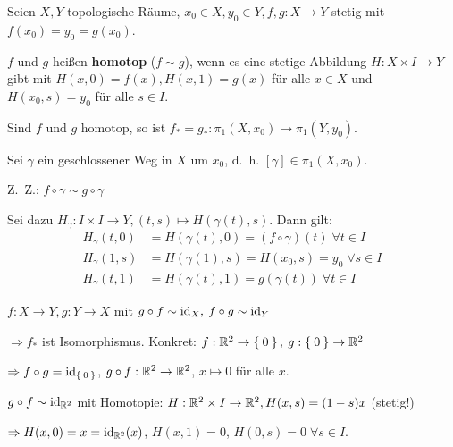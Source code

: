 \begin{definition}
    Seien $X, Y$ topologische Räume, $x_0 \in X, y_0 \in Y, f, g: X \rightarrow Y$
    stetig mit $f(x_0) = y_0 = g(x_0)$.

    $f$ und $g$ heißen \textbf{homotop} ($f \sim g$), wenn es eine stetige
    Abbildung $H: X \times I \rightarrow Y$ gibt mit $H(x,0) = f(x), H(x,1)=g(x)$
    für alle $x \in X$ und $H(x_0, s) = y_0$ für alle $s \in I$.
\end{definition}

\begin{bemerkung}
    Sind $f$ und $g$ homotop, so ist $f_* = g_*: \pi_1 (X, x_0) \rightarrow \pi_1(Y, y_0)$.
\end{bemerkung}

\begin{beweis}
    Sei $\gamma$ ein geschlossener Weg in $X$ um $x_0$, d.~h.
    $[\gamma] \in \pi_1 (X, x_0)$.

    Z.~Z.: $f \circ \gamma \sim g \circ \gamma$

    Sei dazu $H_\gamma: I \times I \rightarrow Y, (t,s) \mapsto H(\gamma(t), s)$.
    Dann gilt: 
        \begin{align*}
            H_\gamma(t,0) &= H(\gamma(t), 0) = (f \circ \gamma)(t) \;\forall t \in I\\
            H_\gamma(1,s) &= H(\gamma(1), s) = H(x_0, s) = y_0\;\forall s \in I\\
            H_\gamma(t,1) &= H(\gamma(t), 1) = g(\gamma(t))\;\forall t \in I
        \end{align*}
\end{beweis}

\begin{beispiel}
    $f:X \rightarrow Y, g: Y \rightarrow X$ mit $g \circ f \sim \textnormal{id}_X,$
    $f \circ g \sim \textnormal{id}_Y$

    $\Rightarrow f_*$ ist Isomorphismus. Konkret: $f: \mathbb{R}^2 \rightarrow \Set{0},$
    $g:\Set{0} \rightarrow \mathbb{R}^2$

    $\Rightarrow f \circ g = \textnormal{id}_{\Set{0}}$, $g \circ f: \mathbb{R}^2 \rightarrow \mathbb{R}^2$,
    $x \mapsto 0$ für alle $x$.

    $g \circ f \sim \textnormal{id}_{\mathbb{R}^2}$ mit Homotopie: $H: \mathbb{R}^2 \times I \rightarrow \mathbb{R}^2, H(x,s) = (1-s) x$ (stetig!)

    $\Rightarrow H(x,0) = x = \textnormal{id}_{\mathbb{R}^2} (x)$, $H(x, 1) = 0$, $H(0, s) = 0\;\forall s \in I$.
\end{beispiel}

